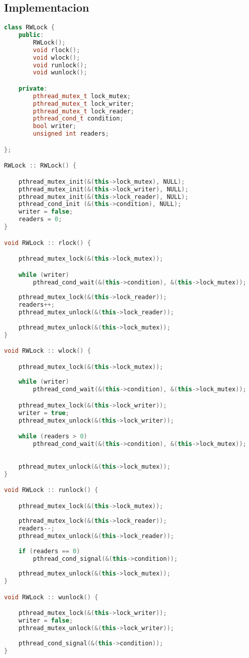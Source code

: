 \subsection{Implementacion}
\begin{lstlisting}[language=C++, breaklines=true]
class RWLock {
    public:
        RWLock();
        void rlock();
        void wlock();
        void runlock();
        void wunlock();

    private:
	    pthread_mutex_t lock_mutex;
        pthread_mutex_t lock_writer;
	    pthread_mutex_t lock_reader;
	    pthread_cond_t condition;	
	    bool writer;
	    unsigned int readers;

};

RWLock :: RWLock() {

	pthread_mutex_init(&(this->lock_mutex), NULL);
	pthread_mutex_init(&(this->lock_writer), NULL);
	pthread_mutex_init(&(this->lock_reader), NULL);
	pthread_cond_init (&(this->condition), NULL);
	writer = false;
	readers = 0;
}

void RWLock :: rlock() {

	pthread_mutex_lock(&(this->lock_mutex));

	while (writer) 
		pthread_cond_wait(&(this->condition), &(this->lock_mutex));
		
	pthread_mutex_lock(&(this->lock_reader));
	readers++;
	pthread_mutex_unlock(&(this->lock_reader));
	
	pthread_mutex_unlock(&(this->lock_mutex));
}

void RWLock :: wlock() {

	pthread_mutex_lock(&(this->lock_mutex));
	
	while (writer)
		pthread_cond_wait(&(this->condition), &(this->lock_mutex));

	pthread_mutex_lock(&(this->lock_writer));
	writer = true;
	pthread_mutex_unlock(&(this->lock_writer));

	while (readers > 0) 
		pthread_cond_wait(&(this->condition), &(this->lock_mutex));
	
	
	pthread_mutex_unlock(&(this->lock_mutex));
}

void RWLock :: runlock() {

	pthread_mutex_lock(&(this->lock_mutex));
	
	pthread_mutex_lock(&(this->lock_reader));
	readers--;
	pthread_mutex_unlock(&(this->lock_reader));
	
	if (readers == 0)
		pthread_cond_signal(&(this->condition));
	
	pthread_mutex_unlock(&(this->lock_mutex));
}

void RWLock :: wunlock() {

	pthread_mutex_lock(&(this->lock_writer));
	writer = false;
	pthread_mutex_unlock(&(this->lock_writer));
	
	pthread_cond_signal(&(this->condition));
}
\end{lstlisting}